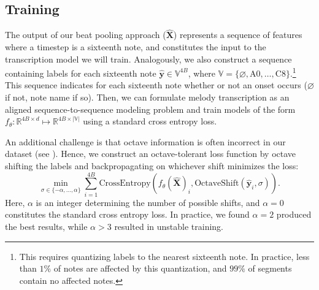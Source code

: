 \subsection{Training}

The output of our beat pooling approach ($\hat{\bm{X}}$) represents a sequence of features where a timestep is a sixteenth note, and constitutes the input to the transcription model we will train. 
Analogously, we also construct a sequence containing labels for each sixteenth note $\hat{\bm{y}} \in \mathbb{V}^{4B}$, where 
$\mathbb{V} = \{\varnothing, \text{A0}, \ldots, \text{C8}\}$.\footnote{This requires quantizing labels to the nearest sixteenth note. In practice, less than $1\%$ of notes are affected by this quantization, and $99\%$ of segments contain no affected notes.} 
This sequence indicates for each sixteenth note whether or not an onset occurs ($\varnothing$ if not, note name if so). 
Then, we can formulate melody transcription as an aligned sequence-to-sequence modeling problem and train models of the form $f_{\theta} : \mathbb{R}^{4B \times d} \mapsto \mathbb{R}^{4B \times |\mathbb{V}|}$ using a standard cross entropy loss. 

An additional challenge is that octave information is often incorrect in our dataset (see ). 
Hence, we construct an octave-tolerant loss function by octave shifting the labels and backpropagating on whichever shift minimizes the loss:
\begin{equation*}
\operatorname*{min}_{\sigma \in \{-\alpha, \ldots, \alpha\}} \sum_{i=1}^{4B} \text{CrossEntropy}(f_{\theta}(\bm{\hat{X}})_i, \text{OctaveShift}(\hat{\bm{y}}_i, \sigma)). 
\end{equation*}
Here, $\alpha$ is an integer determining the number of possible shifts, and $\alpha = 0$ constitutes the standard cross entropy loss. 
In practice, we found $\alpha = 2$ produced the best results, while $\alpha > 3$ resulted in unstable training.
